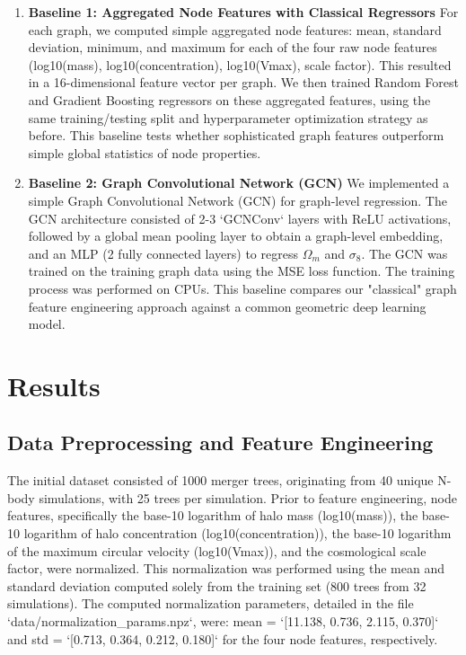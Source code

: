 \documentclass[twocolumn]{aastex631}
\begin{document}
\begin{enumerate}
    \item \textbf{Baseline 1: Aggregated Node Features with Classical Regressors}
    For each graph, we computed simple aggregated node features: mean, standard deviation, minimum, and maximum for each of the four raw node features (log10(mass), log10(concentration), log10(Vmax), scale factor). This resulted in a 16-dimensional feature vector per graph. We then trained Random Forest and Gradient Boosting regressors on these aggregated features, using the same training/testing split and hyperparameter optimization strategy as before. This baseline tests whether sophisticated graph features outperform simple global statistics of node properties.

    \item \textbf{Baseline 2: Graph Convolutional Network (GCN)}
    We implemented a simple Graph Convolutional Network (GCN) for graph-level regression. The GCN architecture consisted of 2-3 `GCNConv` layers with ReLU activations, followed by a global mean pooling layer to obtain a graph-level embedding, and an MLP (2 fully connected layers) to regress $\Omega_m$ and $\sigma_8$. The GCN was trained on the training graph data using the MSE loss function. The training process was performed on CPUs. This baseline compares our "classical" graph feature engineering approach against a common geometric deep learning model.
\end{enumerate}

\section{Results}
\label{sec:results}
\subsection{Data Preprocessing and Feature Engineering}

The initial dataset consisted of 1000 merger trees, originating from 40 unique N-body simulations, with 25 trees per simulation. Prior to feature engineering, node features, specifically the base-10 logarithm of halo mass (log10(mass)), the base-10 logarithm of halo concentration (log10(concentration)), the base-10 logarithm of the maximum circular velocity (log10(Vmax)), and the cosmological scale factor, were normalized. This normalization was performed using the mean and standard deviation computed solely from the training set (800 trees from 32 simulations). The computed normalization parameters, detailed in the file `data/normalization_params.npz`, were: mean = `[11.138, 0.736, 2.115, 0.370]` and std = `[0.713, 0.364, 0.212, 0.180]` for the four node features, respectively.
\end{document}
